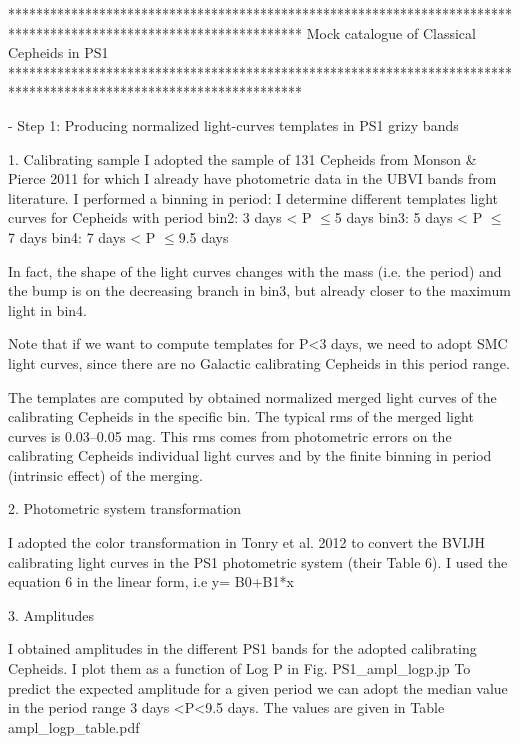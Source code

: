 ******************************************************************************************************************
Mock catalogue of Classical Cepheids in PS1
******************************************************************************************************************

- Step 1: Producing normalized light-curves templates in PS1 grizy bands

        1. Calibrating sample
            I adopted the sample of 131 Cepheids from Monson & Pierce 2011 for which I already have photometric data
            in the UBVI bands from literature.
            I performed a binning in period: I determine different templates light curves
            for Cepheids with period
            bin2:  3 days < P $\leqslant$5 days 
            bin3:  5 days < P $\leqslant$7 days 
            bin4:  7 days < P $\leqslant$9.5 days 
            
            In fact, the shape of the light curves changes with the mass (i.e. the period) 
            and the bump is on the decreasing branch in bin3, but already
            closer to the maximum light in bin4.
            
            Note that if we want to compute templates for P<3 days,
            we need to adopt SMC light curves, since there are no Galactic
            calibrating Cepheids in this period range.
            
            The templates are computed by obtained normalized merged light curves
            of the calibrating Cepheids in the specific bin.
            The typical rms of the merged light curves is 0.03--0.05 mag.
            This rms comes from photometric errors on the 
            calibrating Cepheids individual light curves and by the finite binning in period
            (intrinsic effect) of the merging.
            
        2. Photometric system transformation
        
            I adopted the color transformation in Tonry et al. 2012 to convert the 
            BVIJH calibrating light curves in the PS1 photometric system (their Table 6).
            I used the equation 6 in the linear form, i.e y= B0+B1*x
        
        
        3. Amplitudes
        
            I obtained amplitudes in the different PS1 bands for the adopted calibrating Cepheids.
            I plot them as a function of Log P in Fig. PS1_ampl_logp.jp 
            To predict the expected amplitude for a given period 
            we can adopt the median value in the period range 3 days <P<9.5 days.
            The values are given in Table ampl_logp_table.pdf
            
